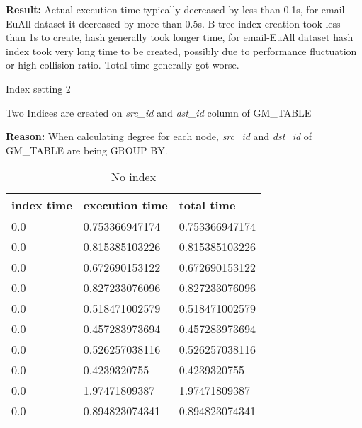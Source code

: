 \begin{itemize*}
\par \textbf{Result:} Actual execution time typically decreased by less than 0.1s, for email-EuAll dataset it decreased by more than 0.5s. B-tree index creation took less than 1s to create, hash generally took longer time, for email-EuAll dataset hash index took very long time to be created, possibly due to performance fluctuation or high collision ratio. Total time generally got worse.
\item{Index setting 2}
\par Two Indices are created on \textit{src\_id} and \textit{dst\_id} column of GM\_TABLE
\par \textbf{Reason:} When calculating degree for each node, \textit{src\_id} and \textit{dst\_id} of GM\_TABLE are being GROUP BY.

\begin{table}[H]
\begin{center}
\begin{tabular}{|l|l|l|}
\hline
index time & execution time & total time     \\ \hline
0.0 & 0.753366947174 & 0.753366947174 \\ \hline
0.0 & 0.815385103226 & 0.815385103226 \\ \hline
0.0 & 0.672690153122 & 0.672690153122 \\ \hline
0.0 & 0.827233076096 & 0.827233076096 \\ \hline
0.0 & 0.518471002579 & 0.518471002579 \\ \hline
0.0 & 0.457283973694 & 0.457283973694 \\ \hline
0.0 & 0.526257038116 & 0.526257038116 \\ \hline
0.0 & 0.4239320755   & 0.4239320755   \\ \hline
0.0 & 1.97471809387  & 1.97471809387  \\ \hline
0.0 & 0.894823074341 & 0.894823074341 \\ \hline
\end{tabular}
\end{center}
\caption{No index}
\end{table}


\end{itemize*}
